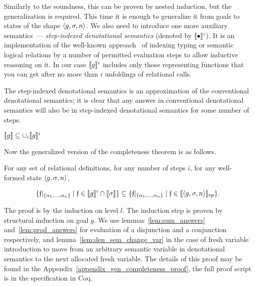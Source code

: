 Similarly to the soundness, this can be proven by nested induction, but the generalization is required. This time it is enough to generalize it from goals
to states of the shape $\left<{g, \sigma, n}\right>$. We also need to introduce one more auxiliary semantics~--- \emph{step-indexed denotational semantics} (denoted by $\llbracket{\bullet}\rrbracket^i$). It is an implementation of the well-known approach~\cite{StepIndexing} of indexing typing or semantic logical relations by a number of permitted evaluation steps to allow inductive reasoning on it.
In our case $\llbracket{g}\rrbracket^i$ includes only those representing functions that you can get after no more than $i$ unfoldings of relational calls.

The step-indexed denotational semantics is an approximation of the conventional denotational semantics; it is clear that any answer in conventional denotational semantics will also be in step-indexed denotational semantics for some number of steps.

\begin{lemma}
$\llbracket{g}\rrbracket \subseteq \cup_i \llbracket{g}\rrbracket^i$
\end{lemma}

Now the generalized version of the completeness theorem is as follows.

\begin{lemma}
\label{lem:gen_completeness}
For any set of relational definitions, for any number of steps $i$, for any well-formed state $\left<{g, \sigma, n}\right>$,

\[
\{\mathfrak{f}|_{\{\alpha_1,\dots,\alpha_n\}} \mid \mathfrak{f} \in \llbracket{g}\rrbracket^i \cap \llbracket{\sigma}\rrbracket\} \subseteq \{\mathfrak{f}|_{\{\alpha_1,\dots,\alpha_n\}} \mid \mathfrak{f} \in \llbracket{\left<{g, \sigma, n}\right>}\rrbracket_{op}\}.
\]
\end{lemma}

The proof is by the induction on level $l$. The induction step is proven by structural induction on goal $g$. We use lemmas~\ref{lem:sum_answers} and~\ref{lem:prod_answers} for evaluation of a disjunction and a conjunction respectively, and lemma~\ref{lem:den_sem_change_var} in the case of fresh variable introduction to move from an arbitrary semantic variable in denotational semantics to the next allocated fresh variable. The details of this proof may be found in the Appendix~\ref{appendix_gen_completeness_proof}, the full proof script is in the specification in Coq.
